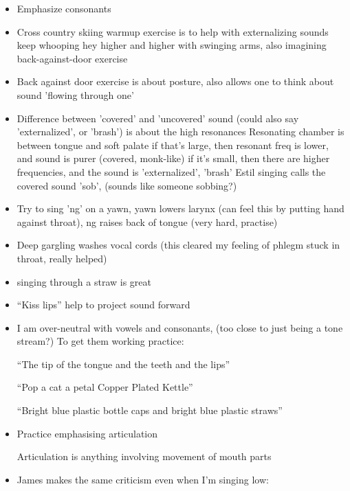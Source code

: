 \documentclass[14pt,a4paper]{memoir}
\begin{document}
\begin{itemize}
  \item Emphasize consonants


  \item Cross country skiing warmup exercise is to help with externalizing sounds
    keep whooping hey higher and higher with swinging arms, also imagining back-against-door exercise

  \item Back against door exercise is about posture, also allows one to think about sound 'flowing through one'

  \item Difference between 'covered' and 'uncovered' sound (could also say 'externalized', or 'brash')
    is about the high resonances
    Resonating chamber is between tongue and soft palate
    if that's large, then resonant freq is lower, and sound is purer (covered, monk-like)
    if it's small, then there are higher frequencies, and the sound is 'externalized', 'brash'
    Estil singing calls the covered sound 'sob', (sounds like someone sobbing?)

  \item Try to sing 'ng' on a yawn, yawn lowers larynx (can feel this by putting hand against throat), ng raises back of tongue (very hard, practise)

  \item Deep gargling washes vocal cords (this cleared my feeling of phlegm stuck in throat, really helped)

  \item singing through a straw is great

  \item ``Kiss lips'' help to project sound forward

  \item I am over-neutral with vowels and consonants, (too close to just being a tone stream?)
  To get them working practice:

  ``The tip of the tongue and the teeth and the lips''
  
  ``Pop a cat a petal Copper Plated Kettle''

  ``Bright blue plastic bottle caps and bright blue plastic straws''

  \item Practice emphasising articulation

    Articulation is anything involving movement of mouth parts

  \item James makes the same criticism even when I'm singing low:


\end{itemize}
\end{document}
